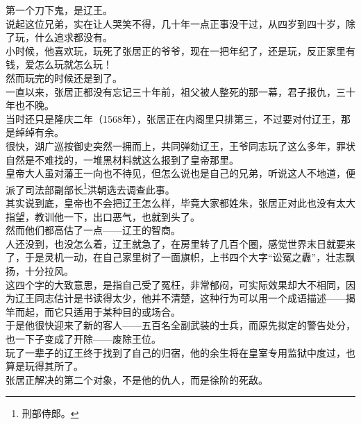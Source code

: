 \begin{multicols}{\theparacolNo}
第一个刀下鬼，是辽王。\\

说起这位兄弟，实在让人哭笑不得，几十年一点正事没干过，从四岁到四十岁，除了玩，什么追求都没有。\\

小时候，他喜欢玩，玩死了张居正的爷爷，现在一把年纪了，还是玩，反正家里有钱，爱怎么玩就怎么玩！\\

然而玩完的时候还是到了。\\

一直以来，张居正都没有忘记三十年前，祖父被人整死的那一幕，君子报仇，三十年也不晚。\\

当时还只是隆庆二年（1568年），张居正在内阁里只排第三，不过要对付辽王，那是绰绰有余。\\

很快，湖广巡按御史突然一拥而上，共同弹劾辽王，王爷同志玩了这么多年，罪状自然是不难找的，一堆黑材料就这么报到了皇帝那里。\\

皇帝大人虽对藩王一向也不待见，但怎么说也是自己的兄弟，听说这人不地道，便派了司法部副部长\footnote{刑部侍郎。}洪朝选去调查此事。\\

其实说到底，皇帝也不会把辽王怎么样，毕竟大家都姓朱，张居正对此也没有太大指望，教训他一下，出口恶气，也就到头了。\\

然而他们都高估了一点——辽王的智商。\\

人还没到，也没怎么着，辽王就急了，在房里转了几百个圈，感觉世界末日就要来了，于是灵机一动，在自己家里树了一面旗帜，上书四个大字“讼冤之纛”，壮志飘扬，十分拉风。\\

这四个字的大致意思，是指自己受了冤枉，非常郁闷，可实际效果却大不相同，因为辽王同志估计是书读得太少，他并不清楚，这种行为可以用一个成语描述——揭竿而起，而它只适用于某种目的或场合。\\

于是他很快迎来了新的客人——五百名全副武装的士兵，而原先拟定的警告处分，也一下子变成了开除——废除王位。\\

玩了一辈子的辽王终于找到了自己的归宿，他的余生将在皇室专用监狱中度过，也算是玩得其所了。\\

张居正解决的第二个对象，不是他的仇人，而是徐阶的死敌。\\


\end{multicols}
